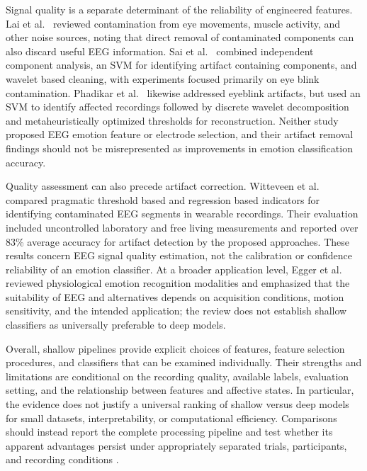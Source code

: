 \documentclass[ASNA,twocolumn]{USG}
\begin{document}
Signal quality is a separate determinant of the reliability of engineered features. Lai et al.~\cite{lai2018artifacts} reviewed contamination from eye movements, muscle activity, and other noise sources, noting that direct removal of contaminated components can also discard useful EEG information. Sai et al.~\cite{sai2017automated} combined independent component analysis, an SVM for identifying artifact containing components, and wavelet based cleaning, with experiments focused primarily on eye blink contamination. Phadikar et al.~\cite{phadikar2020automatic} likewise addressed eyeblink artifacts, but used an SVM to identify affected recordings followed by discrete wavelet decomposition and metaheuristically optimized thresholds for reconstruction. Neither study proposed EEG emotion feature or electrode selection, and their artifact removal findings should not be misrepresented as improvements in emotion classification accuracy.

Quality assessment can also precede artifact correction. Witteveen et al.~\cite{witteveen2019comparison} compared pragmatic threshold based and regression based indicators for identifying contaminated EEG segments in wearable recordings. Their evaluation included uncontrolled laboratory and free living measurements and reported over 83\% average accuracy for artifact detection by the proposed approaches. These results concern EEG signal quality estimation, not the calibration or confidence reliability of an emotion classifier. At a broader application level, Egger et al.~\cite{egger2019emotion} reviewed physiological emotion recognition modalities and emphasized that the suitability of EEG and alternatives depends on acquisition conditions, motion sensitivity, and the intended application; the review does not establish shallow classifiers as universally preferable to deep models.

Overall, shallow pipelines provide explicit choices of features, feature selection procedures, and classifiers that can be examined individually. Their strengths and limitations are conditional on the recording quality, available labels, evaluation setting, and the relationship between features and affective states. In particular, the evidence does not justify a universal ranking of shallow versus deep models for small datasets, interpretability, or computational efficiency. Comparisons should instead report the complete processing pipeline and test whether its apparent advantages persist under appropriately separated trials, participants, and recording conditions \cite{roy2019deep,alarcao2017emotions}.
\end{document}
